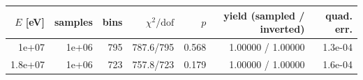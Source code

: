 \begin{tabular}{rrrrrrr}
\toprule
$E$ [eV] & samples & bins & $\chi^2/\mathrm{dof}$ & $p$ & yield (sampled / inverted) & quad. err. \\
\midrule
1e+07 & 1e+06 & 795 & 787.6/795 & 0.568 & 1.00000 / 1.00000 & 1.3e-04 \\
1.8e+07 & 1e+06 & 723 & 757.8/723 & 0.179 & 1.00000 / 1.00000 & 1.6e-04 \\
\bottomrule
\end{tabular}
